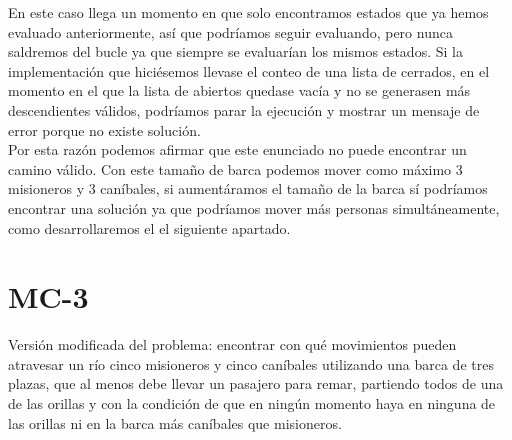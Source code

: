 \documentclass{article}
\begin{document}
En este caso llega un momento en que solo encontramos estados que ya hemos evaluado anteriormente, así que podríamos seguir evaluando, pero nunca saldremos del bucle ya que siempre se evaluarían los mismos estados. Si la implementación que hiciésemos llevase el conteo de una lista de cerrados, en el momento en el que la lista de abiertos quedase vacía y no se generasen más descendientes válidos, podríamos parar la ejecución y mostrar un mensaje de error porque no existe solución. \\

Por esta razón podemos afirmar que este enunciado no puede encontrar un camino válido. Con este tamaño de barca podemos mover como máximo 3 misioneros y 3 caníbales, si aumentáramos el tamaño de la barca sí podríamos encontrar una solución ya que podríamos mover más personas simultáneamente, como desarrollaremos el el siguiente apartado.


\pagebreak
\section{MC-3}
Versión modificada del problema: encontrar con qué movimientos pueden atravesar un río cinco misioneros y cinco caníbales utilizando una barca de tres plazas, que al menos debe llevar un pasajero para remar, partiendo todos de una de las orillas y con la condición de que en ningún momento haya en ninguna de las orillas ni en la barca más caníbales que misioneros.
\end{document}
